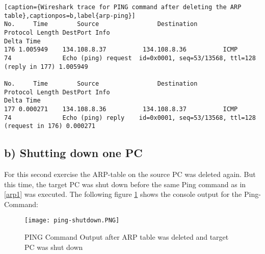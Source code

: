 \begin{lstlisting}[caption={Wireshark trace for PING command after deleting the ARP table},captionpos=b,label{arp-ping}]
No.     Time        Source                Destination           Protocol Length DestPort Info                                                            Delta Time
176 1.005949    134.108.8.37          134.108.8.36          ICMP     74              Echo (ping) request  id=0x0001, seq=53/13568, ttl=128 (reply in 177) 1.005949

No.     Time        Source                Destination           Protocol Length DestPort Info                                                            Delta Time
177 0.000271    134.108.8.36          134.108.8.37          ICMP     74              Echo (ping) reply    id=0x0001, seq=53/13568, ttl=128 (request in 176) 0.000271

\end{lstlisting}
\subsection{b) Shutting down one PC}
For this second exercise the ARP-table on the source PC was deleted again. But this time, the target PC was shut down before the same Ping command as in \ref{arp1} was executed. The following figure \ref{ping-shutdown} shows the console output for the Ping-Command:

\begin{figure}[H]
	\centering
	\texttt{[image: ping-shutdown.PNG]}
	\caption{PING Command Output after ARP table was deleted and target PC was shut down}
	\label{ping-shutdown}
\end{figure} 

